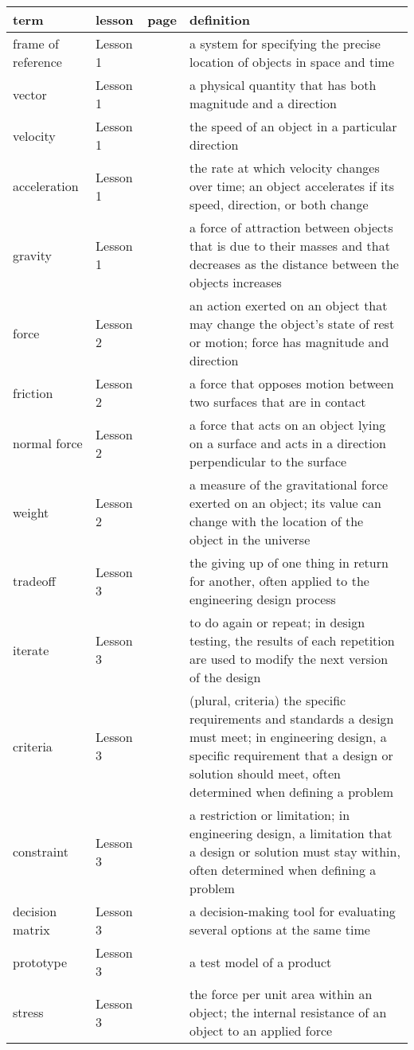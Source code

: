 \documentclass[11pt]{article}
\begin{document}
\begin{center}
\begin{tabular}{llll}
term & lesson & page & definition\\[0pt]
\hline
\hline
frame of reference & Lesson 1 &  & a system for specifying the precise location of objects in space and time\\[0pt]
vector & Lesson 1 &  & a physical quantity that has both magnitude and a direction\\[0pt]
velocity & Lesson 1 &  & the speed of an object in a particular direction\\[0pt]
acceleration & Lesson 1 &  & the rate at which velocity changes over time; an object accelerates if its speed, direction, or both change\\[0pt]
gravity & Lesson 1 &  & a force of attraction between objects that is due to their masses and that decreases as the distance between the objects increases\\[0pt]
\hline
force & Lesson 2 &  & an action exerted on an object that may change the object's state of rest or motion; force has magnitude and direction\\[0pt]
friction & Lesson 2 &  & a force that opposes motion between two surfaces that are in contact\\[0pt]
normal force & Lesson 2 &  & a force that acts on an object lying on a surface and acts in a direction perpendicular to the surface\\[0pt]
weight & Lesson 2 &  & a measure of the gravitational force exerted on an object; its value can change with the location of the object in the universe\\[0pt]
\hline
tradeoff & Lesson 3 &  & the giving up of one thing in return for another, often applied to the engineering design process\\[0pt]
iterate & Lesson 3 &  & to do again or repeat; in design testing, the results of each repetition are used to modify the next version of the design\\[0pt]
criteria & Lesson 3 &  & (plural, criteria) the specific requirements and standards a design must meet; in engineering design, a specific requirement that a design or solution should meet, often determined when defining a problem\\[0pt]
constraint & Lesson 3 &  & a restriction or limitation; in engineering design, a limitation that a design or solution must stay within, often determined when defining a problem\\[0pt]
decision matrix & Lesson 3 &  & a decision-making tool for evaluating several options at the same time\\[0pt]
prototype & Lesson 3 &  & a test model of a product\\[0pt]
stress & Lesson 3 &  & the force per unit area within an object; the internal resistance of an object to an applied force\\[0pt]
\end{tabular}
\end{center}
\end{document}
